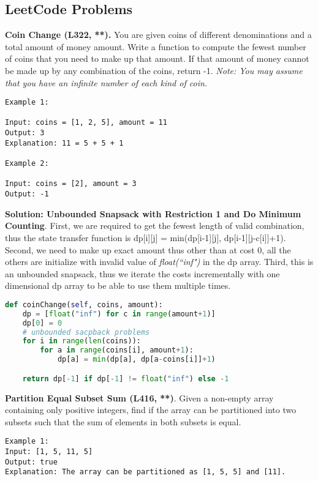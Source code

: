 \documentclass[../main.tex]{subfiles}
\begin{document}
\subsection{LeetCode Problems}
\begin{examples}[resume]
\item \textbf{Coin Change (L322, **).} You are given coins of different denominations and a total amount of money amount. Write a function to compute the fewest number of coins that you need to make up that amount. If that amount of money cannot be made up by any combination of the coins, return -1. \textit{Note:
You may assume that you have an infinite number of each kind of coin.}
\begin{lstlisting}[numbers=none]
Example 1:

Input: coins = [1, 2, 5], amount = 11
Output: 3 
Explanation: 11 = 5 + 5 + 1

Example 2:

Input: coins = [2], amount = 3
Output: -1
\end{lstlisting}

\textbf{Solution: Unbounded Snapsack with Restriction 1 and Do Minimum Counting}. First, we are required to get the fewest length of valid combination, thus the state transfer function is dp[i][j] = min(dp[i-1][j], dp[i-1][j-c[i]]+1). Second, we need to make up exact amount thus other than at cost 0, all the others are initialize with invalid value of \textit{float(``inf")} in the dp array.  Third, this is an unbounded snapsack, thus we iterate the costs incrementally with one dimensional dp array to be able to use them multiple times.
\begin{lstlisting}[language=Python]
def coinChange(self, coins, amount):
    dp = [float("inf") for c in range(amount+1)]
    dp[0] = 0
    # unbounded sacpback problems
    for i in range(len(coins)):
        for a in range(coins[i], amount+1):
            dp[a] = min(dp[a], dp[a-coins[i]]+1)

    return dp[-1] if dp[-1] != float("inf") else -1
\end{lstlisting}
\item \textbf{Partition Equal Subset Sum (L416, **)}. Given a non-empty array containing only positive integers, find if the array can be partitioned into two subsets such that the sum of elements in both subsets is equal.
\begin{lstlisting}[numbers=none]
Example 1:
Input: [1, 5, 11, 5]
Output: true
Explanation: The array can be partitioned as [1, 5, 5] and [11].


\end{lstlisting}
\end{examples}
\end{document}
